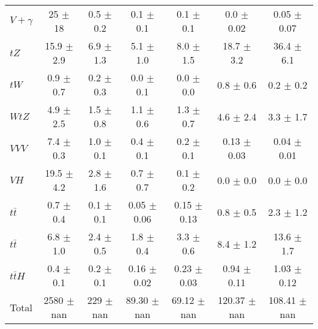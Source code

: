 \begin{tabular}{|l|S|S|S|S|S|S|}
  $V+\gamma$   & 25 $\pm$ 18 & 0.5 $\pm$ 0.2 & 0.1 $\pm$ 0.1 & 0.1 $\pm$ 0.1 & 0.0 $\pm$ 0.02 & 0.05 $\pm$ 0.07 \\ 
  $tZ$   & 15.9 $\pm$ 2.9 & 6.9 $\pm$ 1.3 & 5.1 $\pm$ 1.0 & 8.0 $\pm$ 1.5 & 18.7 $\pm$ 3.2 & 36.4 $\pm$ 6.1 \\ 
  $tW$   & 0.9 $\pm$ 0.7 & 0.2 $\pm$ 0.3 & 0.0 $\pm$ 0.1 & 0.0 $\pm$ 0.0 & 0.8 $\pm$ 0.6 & 0.2 $\pm$ 0.2 \\ 
  $WtZ$   & 4.9 $\pm$ 2.5 & 1.5 $\pm$ 0.8 & 1.1 $\pm$ 0.6 & 1.3 $\pm$ 0.7 & 4.6 $\pm$ 2.4 & 3.3 $\pm$ 1.7 \\ 
  $VVV$   & 7.4 $\pm$ 0.3 & 1.0 $\pm$ 0.1 & 0.4 $\pm$ 0.1 & 0.2 $\pm$ 0.1 & 0.13 $\pm$ 0.03 & 0.04 $\pm$ 0.01 \\ 
  $VH$   & 19.5 $\pm$ 4.2 & 2.8 $\pm$ 1.6 & 0.7 $\pm$ 0.7 & 0.1 $\pm$ 0.2 & 0.0 $\pm$ 0.0 & 0.0 $\pm$ 0.0 \\ 
  $t\bar{t}$   & 0.7 $\pm$ 0.4 & 0.1 $\pm$ 0.1 & 0.05 $\pm$ 0.06 & 0.15 $\pm$ 0.13 & 0.8 $\pm$ 0.5 & 2.3 $\pm$ 1.2 \\ 
  $t\bar{t}$   & 6.8 $\pm$ 1.0 & 2.4 $\pm$ 0.5 & 1.8 $\pm$ 0.4 & 3.3 $\pm$ 0.6 & 8.4 $\pm$ 1.2 & 13.6 $\pm$ 1.7 \\ 
  $t\bar{t}H$   & 0.4 $\pm$ 0.1 & 0.2 $\pm$ 0.1 & 0.16 $\pm$ 0.02 & 0.23 $\pm$ 0.03 & 0.94 $\pm$ 0.11 & 1.03 $\pm$ 0.12 \\ 
\hline 
  Total  & 2580 $\pm$ nan & 229 $\pm$ nan & 89.30 $\pm$ nan & 69.12 $\pm$ nan & 120.37 $\pm$ nan & 108.41 $\pm$ nan \\ 
\hline 
\end{tabular} 
